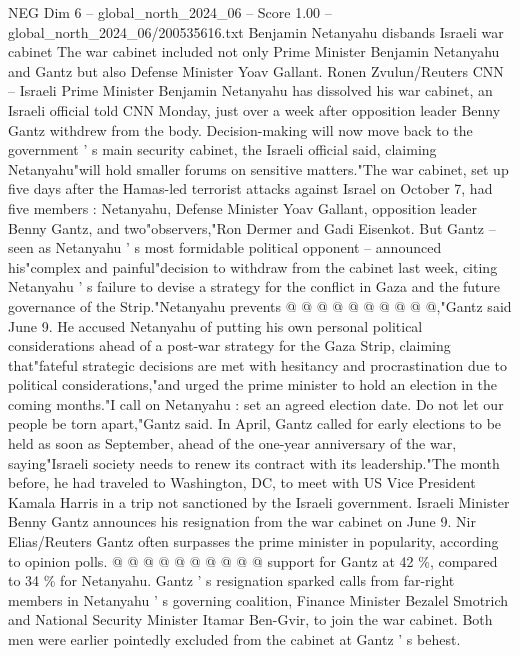 \begin{textsample}{NEG Dim 6 – global\_north\_2024\_06 – Score 1.00 – global\_north\_2024\_06/200535616.txt}  \label{ex:f6_neg_314}
Benjamin Netanyahu disbands Israeli war cabinet The war cabinet included not only Prime Minister Benjamin Netanyahu and Gantz but also Defense Minister Yoav Gallant.
Ronen Zvulun/Reuters CNN -- Israeli Prime Minister Benjamin Netanyahu has dissolved his war cabinet, an Israeli official told CNN Monday, just over a week after opposition leader Benny Gantz withdrew from the body.
Decision-making will now move back to the government ' s main security cabinet, the Israeli official said, claiming Netanyahu"will hold smaller forums on sensitive matters."The war cabinet, set up five days after the Hamas-led terrorist attacks against Israel on October 7, had five members : Netanyahu, Defense Minister Yoav Gallant, opposition leader Benny Gantz, and two"observers,"Ron Dermer and Gadi Eisenkot.
But Gantz -- seen as Netanyahu ' s most formidable political opponent -- announced his"complex and painful"decision to withdraw from the cabinet last week, citing Netanyahu ' s failure to devise a strategy for the conflict in Gaza and the future governance of the Strip."Netanyahu prevents @ @ @ @ @ @ @ @ @ @,"Gantz said June 9.
He accused Netanyahu of putting his own personal political considerations ahead of a post-war strategy for the Gaza Strip, claiming that"fateful strategic decisions are met with hesitancy and procrastination due to political considerations,"and urged the prime minister to hold an election in the coming months."I call on Netanyahu : set an agreed election date.
Do not let our people be torn apart,"Gantz said.
In April, Gantz called for early elections to be held as soon as September, ahead of the one-year anniversary of the war, saying"Israeli society needs to renew its contract with its leadership."The month before, he had traveled to Washington, DC, to meet with US Vice President Kamala Harris in a trip not sanctioned by the Israeli government.
Israeli Minister Benny Gantz announces his resignation from the war cabinet on June 9.
Nir Elias/Reuters Gantz often surpasses the prime minister in popularity, according to opinion polls. @ @ @ @ @ @ @ @ @ @ support for Gantz at 42 \%, compared to 34 \% for Netanyahu.
Gantz ' s resignation sparked calls from far-right members in Netanyahu ' s governing coalition, Finance Minister Bezalel Smotrich and National Security Minister Itamar Ben-Gvir, to join the war cabinet.
Both men were earlier pointedly excluded from the cabinet at Gantz ' s behest.

\end{textsample}

